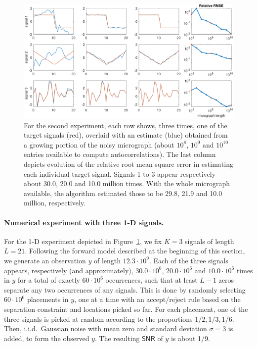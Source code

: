 \documentclass[english,11pt]{article}
\newcommand{\1}{\mathbf{1}}
\newcommand{\TODO}[1]{{\color{red}{[#1]}}}
\numberwithin{equation}{section}
\theoremstyle{plain}
\theoremstyle{definition}
\theoremstyle{remark}
\theoremstyle{plain}
\theoremstyle{remark}
\theoremstyle{plain}
\theoremstyle{plain}
\newcommand{\SNR}{\ensuremath{\textsf{SNR}}}
\begin{document}
\begin{figure}[t]
	\centering
	\includegraphics[width=\linewidth]{heterogeneous_progressive_n12300000000_466300}
	\caption{For the second experiment, each row shows, three times, one of the target signals (red), overlaid with an estimate (blue) obtained from a growing portion of the noisy micrograph (about $10^8$, $10^9$ and $10^{10}$ entries available to compute autocorrelations). The last column depicts evolution of the relative root mean square error in estimating each individual target signal. Signals 1 to 3 appear respectively about 30.0, 20.0 and 10.0 million times. With the whole micrograph available, the algorithm estimated those to be 29.8, 21.9 and 10.0 million, respectively.
	}
	\label{fig:1Dheterosignals}
\end{figure}


\TODO{The following was copying from the Methods section}


\paragraph{Numerical experiment with three 1-D signals.}


For the 1-D experiment depicted in Figure~\ref{fig:1Dheterosignals}, we fix $K = 3$ signals of length $L = 21$. Following the forward model described at the beginning of this section, we generate an observation $y$ of length $12.3 \cdot 10^9$. Each of the three signals appears, respectively (and approximately), $30.0 \cdot 10^6$, $20.0 \cdot 10^6$ and $10.0 \cdot 10^6$ times in $y$ for a total of exactly $60 \cdot 10^6$ occurrences, such that at least $L-1$ zeros separate any two occurrences of any signals. 
This is done by randomly selecting $60 \cdot 10^6$ placements in $y$, one at a time with an accept/reject rule based on the separation constraint and locations picked so far. For each placement, one of the three signals is picked at random according to the proportions $1/2, 1/3, 1/6$. Then, i.i.d.\ Gaussian noise with mean zero and standard deviation $\sigma = 3$ is added, to form the observed $y$. The resulting $\SNR$ of $y$
is about 1/9.
\end{document}
